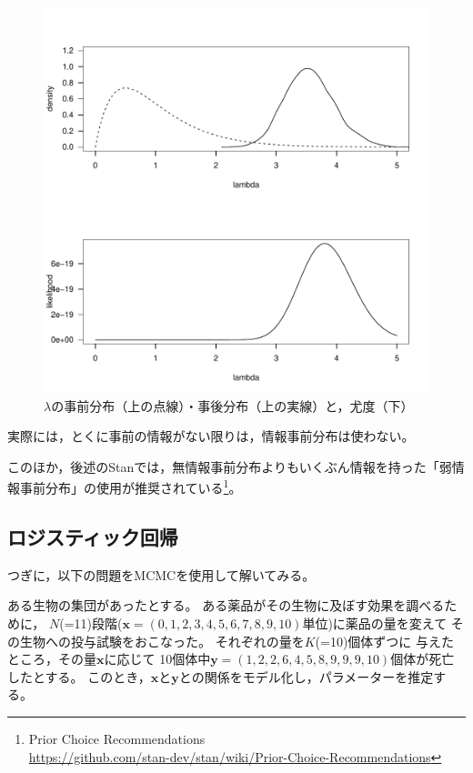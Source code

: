 \documentclass[11pt,uplatex]{jsarticle}
\begin{document}
\begin{figure}[htbp]
	\begin{center}
		\includegraphics[bb=0 0 480 480, clip, width=280 bp]{example1-4.pdf}
	\end{center}
	\caption{$\lambda$の事前分布（上の点線）・事後分布（上の実線）と，尤度（下）}
	\label{prior_posterior}
\end{figure}

実際には，とくに事前の情報がない限りは，情報事前分布は使わない。

このほか，後述の\textsf{Stan}では，無情報事前分布よりもいくぶん情報を持った「弱情報事前分布」の使用が推奨されている\footnote{Prior Choice Recommendations\\ \url{https://github.com/stan-dev/stan/wiki/Prior-Choice-Recommendations}}。



\subsection{ロジスティック回帰}
\label{logistic}


つぎに，以下の問題をMCMCを使用して解いてみる。
\vspace{1zw}

\hspace{18mm}
\begin{minipage}{100mm}
\begin{breakbox}
\noindent
ある生物の集団があったとする。
ある薬品がその生物に及ぼす効果を調べるために，
$N$(=11)段階($\bm{x} = (0, 1, 2, 3, 4, 5, 6, 7, 8, 9, 10)$単位)に薬品の量を変えて
その生物への投与試験をおこなった。
それぞれの量を$K$(=10)個体ずつに
与えたところ，その量$\bm{x}$に応じて
10個体中$\bm{y} = (1, 2, 2, 6, 4, 5, 8, 9, 9, 9, 10)$個体が死亡したとする。
このとき，$\bm{x}$と$\bm{y}$との関係をモデル化し，パラメーターを推定する。
\end{breakbox}
\end{minipage}
\vspace{1zw}
\end{document}
